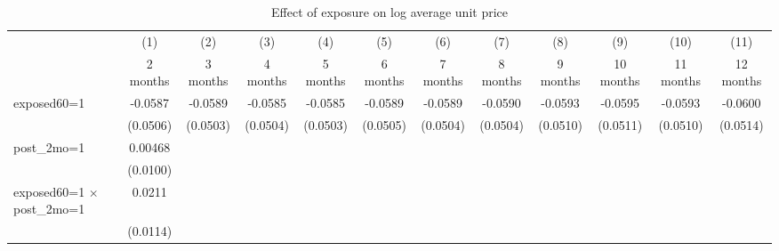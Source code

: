 \begin{table}[htbp]\centering
\def\sym#1{\ifmmode^{#1}\else\(^{#1}\)\fi}
\caption{Effect of exposure on log average unit price}
\begin{tabular}{l*{11}{c}}
\toprule
                    &\multicolumn{1}{c}{(1)}&\multicolumn{1}{c}{(2)}&\multicolumn{1}{c}{(3)}&\multicolumn{1}{c}{(4)}&\multicolumn{1}{c}{(5)}&\multicolumn{1}{c}{(6)}&\multicolumn{1}{c}{(7)}&\multicolumn{1}{c}{(8)}&\multicolumn{1}{c}{(9)}&\multicolumn{1}{c}{(10)}&\multicolumn{1}{c}{(11)}\\
                    &\multicolumn{1}{c}{2 months}&\multicolumn{1}{c}{3 months}&\multicolumn{1}{c}{4 months}&\multicolumn{1}{c}{5 months}&\multicolumn{1}{c}{6 months}&\multicolumn{1}{c}{7 months}&\multicolumn{1}{c}{8 months}&\multicolumn{1}{c}{9 months}&\multicolumn{1}{c}{10 months}&\multicolumn{1}{c}{11 months}&\multicolumn{1}{c}{12 months}\\
\midrule
exposed60=1         &     -0.0587         &     -0.0589         &     -0.0585         &     -0.0585         &     -0.0589         &     -0.0589         &     -0.0590         &     -0.0593         &     -0.0595         &     -0.0593         &     -0.0600         \\
                    &    (0.0506)         &    (0.0503)         &    (0.0504)         &    (0.0503)         &    (0.0505)         &    (0.0504)         &    (0.0504)         &    (0.0510)         &    (0.0511)         &    (0.0510)         &    (0.0514)         \\
\addlinespace
post\_2mo=1          &     0.00468         &                     &                     &                     &                     &                     &                     &                     &                     &                     &                     \\
                    &    (0.0100)         &                     &                     &                     &                     &                     &                     &                     &                     &                     &                     \\
\addlinespace
exposed60=1 $\times$ post\_2mo=1&      0.0211         &                     &                     &                     &                     &                     &                     &                     &                     &                     &                     \\
                    &    (0.0114)         &                     &                     &                     &                     &                     &                     &                     &                     &                     &                     \\

\end{tabular}
\end{table}
